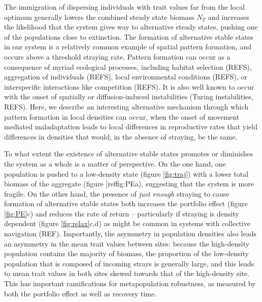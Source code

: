 \documentclass[twocolumn,preprintnumbers,amsmath,amssymb,superscriptaddress]{revtex4}
\begin{document}
The immigration of dispersing individuals with trait values far from the local optimum generally lowers the combined steady state biomass $N_T$ and increases the likelihood that the system gives way to alternative steady states, pushing one of the populations close to extinction.
The formation of alternative stable states in our system is a relatively common example of spatial pattern formation, and occurs above a threshold straying rate.
Pattern formation can occur as a consequence of myriad ecological processes, including habitat selection (REFS), aggregation of individuals (REFS), local environmental conditions (REFS), or interspecific interactions like competition (REFS). 
It is also well known to occur with the onset of spatially or diffusion-induced instabilities (Turing instabilities, REFS). 
Here, we describe an interesting alternative mechanism through which pattern formation in local densities can occur, when the onset of movement mediated maladaptation leads to local differences in reproductive rates that yield differences in densities that would, in the absence of straying, be the same. 


To what extent the existence of alternative stable states promotes or diminishes the system as a whole is a matter of perspective.
On the one hand, one population is pushed to a low-density state (figure \ref{fig:traj}) with a lower total biomass of the aggregate (figure ]ref{fig:PE}a), suggesting that the system is more fragile.
On the other hand, the presence of \emph{just enough} straying to cause formation of alternative stable states both increases the portfolio effect (figure \ref{fig:PE}c) and reduces the rate of return -- particularly if straying is density dependent (figure \ref{fig:relax}c,d) as might be common in systems with collective navigation (REF).
Importantly, the asymmetry in population densities also leads an asymmetry in the mean trait values between sites: because the high-density population contains the majority of biomass, the proportion of the low-density population that is composed of incoming strays is generally large, and this leads to mean trait values in both sites skewed towards that of the high-density site.
This has important ramifications for metapopulation robustness, as measured by both the portfolio effect as well as recovery time.
\end{document}
